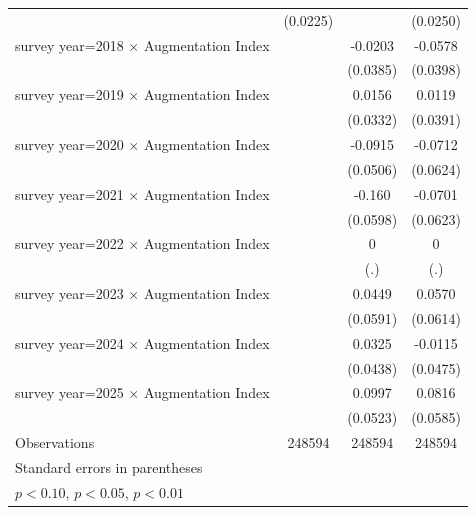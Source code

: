 \begin{table}[htbp]
\begin{tabular}{l*{3}{c}}
                    &    (0.0225)         &                     &    (0.0250)         \\
\addlinespace
survey year=2018 $\times$ Augmentation Index&                     &     -0.0203         &     -0.0578         \\
                    &                     &    (0.0385)         &    (0.0398)         \\
\addlinespace
survey year=2019 $\times$ Augmentation Index&                     &      0.0156         &      0.0119         \\
                    &                     &    (0.0332)         &    (0.0391)         \\
\addlinespace
survey year=2020 $\times$ Augmentation Index&                     &     -0.0915\sym{*}  &     -0.0712         \\
                    &                     &    (0.0506)         &    (0.0624)         \\
\addlinespace
survey year=2021 $\times$ Augmentation Index&                     &      -0.160\sym{***}&     -0.0701         \\
                    &                     &    (0.0598)         &    (0.0623)         \\
\addlinespace
survey year=2022 $\times$ Augmentation Index&                     &           0         &           0         \\
                    &                     &         (.)         &         (.)         \\
\addlinespace
survey year=2023 $\times$ Augmentation Index&                     &      0.0449         &      0.0570         \\
                    &                     &    (0.0591)         &    (0.0614)         \\
\addlinespace
survey year=2024 $\times$ Augmentation Index&                     &      0.0325         &     -0.0115         \\
                    &                     &    (0.0438)         &    (0.0475)         \\
\addlinespace
survey year=2025 $\times$ Augmentation Index&                     &      0.0997\sym{*}  &      0.0816         \\
                    &                     &    (0.0523)         &    (0.0585)         \\
\midrule
Observations        &      248594         &      248594         &      248594         \\
\bottomrule
\multicolumn{4}{l}{\footnotesize Standard errors in parentheses}\\
\multicolumn{4}{l}{\footnotesize \sym{*} \(p<0.10\), \sym{**} \(p<0.05\), \sym{***} \(p<0.01\)}\\
\end{tabular}
\end{table}
